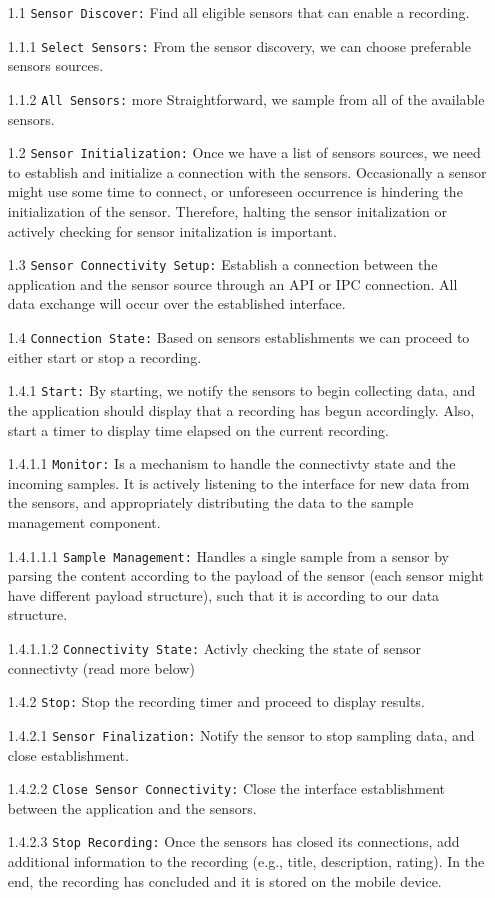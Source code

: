 \begin{itemize}
    \item[1.1] \verb|Sensor Discover:| Find all eligible sensors that can enable a recording.
    \item[1.1.1] \verb|Select Sensors:| From the sensor discovery, we can choose preferable sensors sources.
    \item[1.1.2] \verb|All Sensors:| more Straightforward, we sample from all of the available sensors.
    \item[1.2] \verb|Sensor Initialization:| Once we have a list of sensors sources, we need to establish and initialize a connection with the sensors. Occasionally a sensor might use some time to connect, or unforeseen occurrence is hindering the initialization of the sensor. Therefore, halting the sensor initalization or actively checking for sensor initalization is important. 
    \item[1.3] \verb|Sensor Connectivity Setup:| Establish a connection between the application and the sensor source through an API or IPC connection. All data exchange will occur over the established interface. 
    \item[1.4] \verb|Connection State:| Based on sensors establishments we can proceed to either start or stop a recording. 
    \item[1.4.1] \verb|Start:| By starting, we notify the sensors to begin collecting data, and the application should display that a recording has begun accordingly. Also, start a timer to display time elapsed on the current recording. 
    \item[1.4.1.1] \verb|Monitor:| Is a mechanism to handle the connectivty state and the incoming samples. It is actively listening to the interface for new data from the sensors, and appropriately distributing the data to the sample management component.  
    \item[1.4.1.1.1] \verb|Sample Management:| Handles a single sample from a sensor by parsing the content according to the payload of the sensor (each sensor might have different payload structure), such that it is according to our data structure.
    \item[1.4.1.1.2] \verb|Connectivity State:| Activly checking the state of sensor connectivty (read more below)
    \item[1.4.2] \verb|Stop:| Stop the recording timer and proceed to display results.
    \item[1.4.2.1] \verb|Sensor Finalization:| Notify the sensor to stop sampling data, and close establishment.
    \item[1.4.2.2] \verb|Close Sensor Connectivity:| Close the interface establishment between the application and the sensors. 
    \item[1.4.2.3] \verb|Stop Recording:| Once the sensors has closed its connections, add additional information to the recording (e.g., title, description, rating). In the end, the recording has concluded and it is stored on the mobile device.
\end{itemize}

